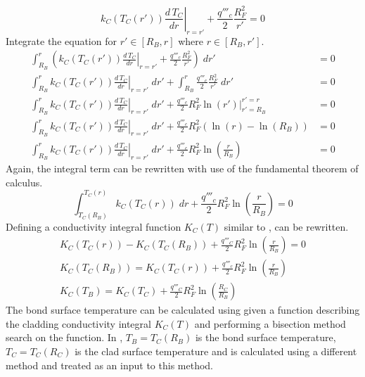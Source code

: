       \begin{equation}
        \left. k_C(T_C(r')) \frac{d\,T_C}{dr} \right|_{r=r'} + 
          \frac{q'''_c}{2} \frac{R_F^2}{r'} = 0
      \end{equation}
      Integrate the equation for $r' \in [R_B,r]$ where $r \in [R_B,r']$.
      \begin{align}
        \int_{R_B}^r \left( \left. k_C(T_C(r')) \frac{d\,T_C}{dr} \right|_{r=r'}
          + \frac{q'''_c}{2} \frac{R_F^2}{r'} \right) \; dr' &= 0 \\
        \int_{R_B}^r \left. k_C(T_C(r')) \frac{d\,T_C}{dr} \right|_{r=r'} \; dr'
          + \int_{R_B}^r \frac{q'''_c}{2} \frac{R_F^2}{r'} \; dr' &= 0 \\
        \int_{R_B}^r \left. k_C(T_C(r')) \frac{d\,T_C}{dr} \right|_{r=r'} \; dr'
          + \frac{q'''_c}{2} R_F^2 \left. \ln(r') \right|_{r'=R_B}^{r'=r} &= 0\\
        \int_{R_B}^r \left. k_C(T_C(r')) \frac{d\,T_C}{dr} \right|_{r=r'} \; dr'
          + \frac{q'''_c}{2} R_F^2 (\ln(r) - \ln(R_B)) &= 0\\
        \int_{R_B}^r \left. k_C(T_C(r')) \frac{d\,T_C}{dr} \right|_{r=r'} \; dr'
          + \frac{q'''_c}{2} R_F^2 \ln\left(\frac{r}{R_B}\right) &= 0
      \end{align}
      Again, the integral term can be rewritten with use of the fundamental
      theorem of calculus.
      \begin{equation}
        \label{eq:clad_integral}
        \int_{T_C(R_B)}^{T_C(r)} k_C(T_C(r)) \; dr +
          \frac{q'''_c}{2} R_F^2 \ln\left(\frac{r}{R_B}\right) = 0
      \end{equation}
      Defining a conductivity integral function $K_C(T)$ similar to
      ,  can be rewritten.
      \begin{gather}
        K_C(T_C(r)) - K_C(T_C(R_B)) + \frac{q'''_C}{2} R_F^2
          \ln\left(\frac{r}{R_B}\right) = 0 \\
        K_C(T_C(R_B)) = K_C(T_C(r)) + \frac{q'''_c}{2} R_F^2
          \ln\left(\frac{r}{R_B}\right) \\
        \label{eq:ktb}
        K_C(T_B) = K_C(T_C) + \frac{q'''_C}{2} R_F^2
          \ln\left(\frac{R_C}{R_B}\right) 
      \end{gather}
      The bond surface temperature can be calculated using  given a
      function describing the cladding conductivity integral $K_C(T)$ and
      performing a bisection method search on the function. In ,
      $T_B = T_C(R_B)$ is the bond surface temperature, $T_C=T_C(R_C)$ is the
      clad surface temperature and is calculated using a different method and
      treated as an input to this method.  

